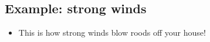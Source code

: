 \documentclass[aspectratio=169,
hyperref={colorlinks,urlcolor=blue}
]{beamer}
\begin{document}




\subsection{Example: strong winds}
\label{subsec:examplestrongwinds}
{
\begin{itemize}
\item This is how strong winds blow roods off your house!
\end{itemize}
}
{
\vspace{2cm}

}





\end{document}
